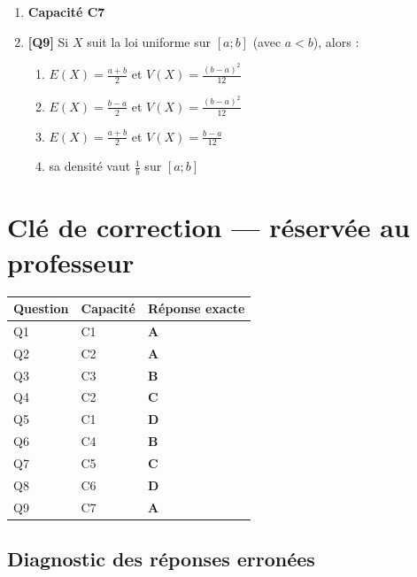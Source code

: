 \begin{enumerate}
\item[] \textbf{Capacité C7}

\item \textbf{[Q9]} Si $X$ suit la loi uniforme sur $[a;b]$ (avec $a<b$), alors :
  \begin{enumerate}[label=\Alph*.]
    \item $E(X)=\tfrac{a+b}2$ et $V(X)=\tfrac{(b-a)^2}{12}$
    \item $E(X)=\tfrac{b-a}2$ et $V(X)=\tfrac{(b-a)^2}{12}$
    \item $E(X)=\tfrac{a+b}2$ et $V(X)=\tfrac{b-a}{12}$
    \item sa densité vaut $\tfrac1b$ sur $[a;b]$
  \end{enumerate}

\end{enumerate}

\ifnxVersionProfesseur
\clearpage
\section*{Clé de correction — réservée au professeur}

\begin{center}
\begin{tabular}{lll}
\hline
Question & Capacité & Réponse exacte \\
\hline
Q1 & C1 & \textbf{A} \\
Q2 & C2 & \textbf{A} \\
Q3 & C3 & \textbf{B} \\
Q4 & C2 & \textbf{C} \\
Q5 & C1 & \textbf{D} \\
Q6 & C4 & \textbf{B} \\
Q7 & C5 & \textbf{C} \\
Q8 & C6 & \textbf{D} \\
Q9 & C7 & \textbf{A} \\
\hline
\end{tabular}
\end{center}

\subsection*{Diagnostic des réponses erronées}

